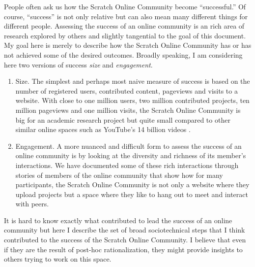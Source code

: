 People often ask us how the Scratch Online Community become ``successful.''
Of course, ``success'' is not only relative but can also mean many different things for different people.
Assessing the success of an online community is an rich area of research explored by others \cite{preece_online_2000} and slightly tangential to the goal of this document. 
My goal here is merely to describe how the Scratch Online Community has or has not achieved some of the desired outcomes.
Broadly speaking, I am considering here two versions of success \emph{size} and \emph{engagement}.
\begin{enumerate}
\item Size. The simplest and perhaps most naive measure of success is based on the number of registered users, contributed content, pageviews and visits to a website. 
With close to one million users, two million contributed projects, ten million pageviews and one million visits, the Scratch Online Community is big for an academic research project but quite small compared to other similar online spaces such as YouTube's 14 billion videos \cite{comscore_comscore_2010}.

\item Engagement. A more nuanced and difficult form to assess the success of an online community is by looking at the diversity and richness of its member's interactions.
We have documented some of these rich interactions through stories of members of the online community that show how for many participants, the Scratch Online Community is not only a website where they upload projects but a space where they like to hang out to meet and interact with peers.
\end{enumerate}

It is hard to know exactly what contributed to lead the success of an online community but here I describe the set of broad sociotechnical steps that I think contributed to the success of the Scratch Online Community. I believe that even if they are the result of post-hoc rationalization, they might provide insights to others trying to work on this space.

